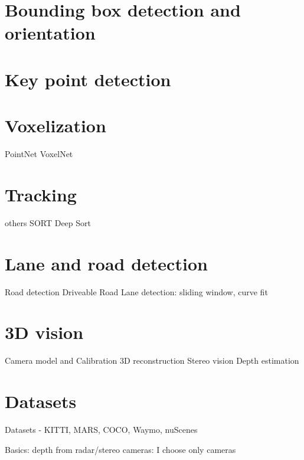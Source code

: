 \section{Bounding box detection and orientation}
\section{Key point detection}
\section{Voxelization }
PointNet
VoxelNet
\section{Tracking}
others
SORT
Deep Sort
\section{Lane and road detection}
Road detection
Driveable Road
Lane detection: sliding window, curve fit
\section{3D vision}
Camera model and Calibration
3D reconstruction
Stereo vision
Depth estimation
\section{Datasets}
Datasets - KITTI, MARS, COCO, Waymo, nuScenes


Basics: depth from radar/stereo cameras: I choose only cameras










